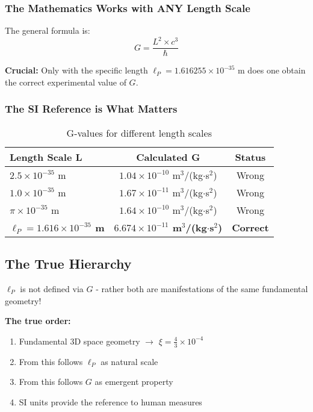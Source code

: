 \documentclass[12pt,a4paper]{article}
\theoremstyle{definition}
\begin{document}
	\subsubsection{The Mathematics Works with ANY Length Scale}
	
	The general formula is:
	\begin{equation}
		G = \frac{L^2 \times c^3}{\hbar}
	\end{equation}
	
	\textbf{Crucial:} Only with the specific length $\ell_P = 1.616255 \times 10^{-35}$ m does one obtain the correct experimental value of $G$.
	
	\subsubsection{The SI Reference is What Matters}
	
	\begin{table}[h]
		\centering
		\begin{tabular}{@{}lcc@{}}
			\toprule
			\textbf{Length Scale L} & \textbf{Calculated G} & \textbf{Status} \\
			\midrule
			$2.5 \times 10^{-35}$ m & $1.04 \times 10^{-10}$ m$^3$/(kg$\cdot$s$^2$) & Wrong \\
			$1.0 \times 10^{-35}$ m & $1.67 \times 10^{-11}$ m$^3$/(kg$\cdot$s$^2$) & Wrong \\
			$\pi \times 10^{-35}$ m & $1.64 \times 10^{-10}$ m$^3$/(kg$\cdot$s$^2$) & Wrong \\
			\textbf{$\ell_P = 1.616 \times 10^{-35}$ m} & \textbf{$6.674 \times 10^{-11}$ m$^3$/(kg$\cdot$s$^2$)} & \textbf{Correct} \\
			\bottomrule
		\end{tabular}
		\caption{G-values for different length scales}
	\end{table}
	
	\subsection{The True Hierarchy}
	
	\begin{tcolorbox}[colback=green!5!white,colframe=green!75!black,title=Correct Interpretation]
		$\ell_P$ is not defined via $G$ - rather both are manifestations of the same fundamental geometry!
		
		\textbf{The true order:}
		\begin{enumerate}
			\item Fundamental 3D space geometry $\rightarrow$ $\xi = \frac{4}{3} \times 10^{-4}$
			\item From this follows $\ell_P$ as natural scale
			\item From this follows $G$ as emergent property  
			\item SI units provide the reference to human measures
		\end{enumerate}
	\end{tcolorbox}
	
\end{document}
